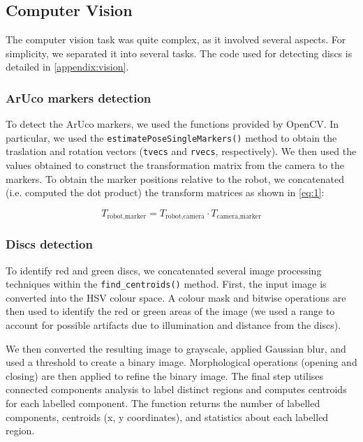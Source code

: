 \documentclass[
	12pt,
]{sty/report_style}
\begin{document}

\subsection{Computer Vision}

The computer vision task was quite complex, as it involved several aspects. For simplicity, we separated it into several tasks. The code used for detecting discs is detailed in \cref{appendix:vision}.

\subsubsection{ArUco markers detection}

To detect the ArUco markers, we used the functions provided by OpenCV. In particular, we used the \verb|estimatePoseSingleMarkers()| method to obtain the traslation and rotation vectors (\verb|tvecs| and \verb|rvecs|, respectively). We then used the values obtained to construct the transformation matrix from the camera to the markers. To obtain the marker positions relative to the robot, we concatenated (i.e. computed the dot product) the transform matrices as shown in \cref{eq:1}:

\begin{equation} \label{eq:1}
T_{\text{robot,marker}} = T_{\text{robot,camera}} \cdot T_{\text{camera,marker}}
\end{equation}

\subsubsection{Discs detection}

To identify red and green discs, we concatenated several image processing techniques within the \verb|find_centroids()| method. First, the input image is converted into the HSV colour space. A colour mask and bitwise operations are then used to identify the red or green areas of the image (we used a range to account for possible artifacts due to illumination and distance from the discs).

We then converted the resulting image to grayscale, applied Gaussian blur, and used a threshold to create a binary image. Morphological operations (opening and closing) are then applied to refine the binary image. The final step utilises connected components analysis to label distinct regions and computes centroids for each labelled component. The function returns the number of labelled components, centroids (x, y coordinates), and statistics about each labelled region. 
\end{document}
